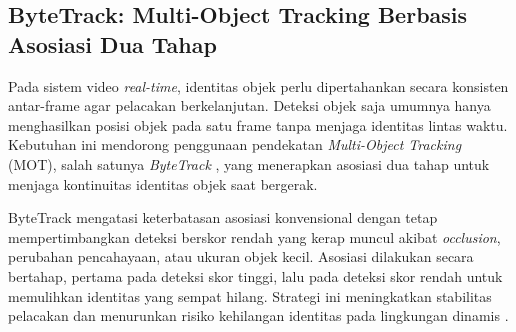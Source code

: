 

\subsection{ByteTrack: Multi-Object Tracking Berbasis Asosiasi Dua Tahap}

Pada sistem video \textit{real-time}, identitas objek perlu dipertahankan
secara konsisten antar-frame agar pelacakan berkelanjutan. Deteksi objek saja
umumnya hanya menghasilkan posisi objek pada satu frame tanpa menjaga
identitas lintas waktu. Kebutuhan ini mendorong penggunaan pendekatan
\textit{Multi-Object Tracking} (MOT), salah satunya \textit{ByteTrack}
\cite{zhang2022bytetrack_eccv}, yang menerapkan asosiasi dua tahap untuk
menjaga kontinuitas identitas objek saat bergerak.

ByteTrack mengatasi keterbatasan asosiasi konvensional dengan tetap
mempertimbangkan deteksi berskor rendah yang kerap muncul akibat
\textit{occlusion}, perubahan pencahayaan, atau ukuran objek kecil. Asosiasi
dilakukan secara bertahap, pertama pada deteksi skor tinggi, lalu pada deteksi
skor rendah untuk memulihkan identitas yang sempat hilang. Strategi ini
meningkatkan stabilitas pelacakan dan menurunkan risiko kehilangan identitas
pada lingkungan dinamis \cite{zhang2022bytetrack_eccv}.

